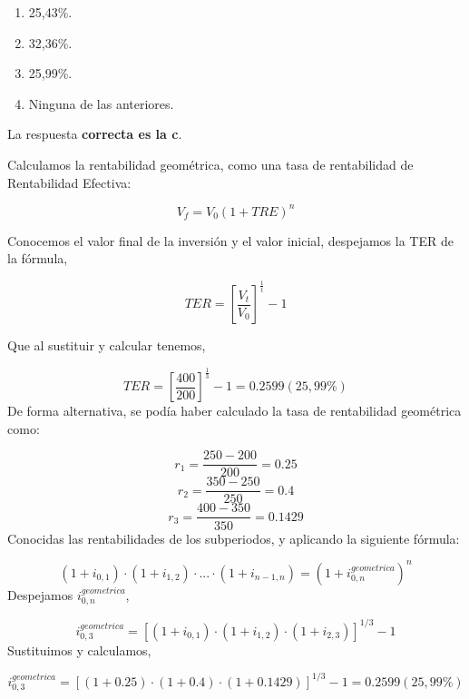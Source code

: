 \documentclass[
  letterpaper,
  DIV=11,
  numbers=noendperiod]{scrreprt}
\begin{document}
\begin{enumerate}
\def\labelenumi{\alph{enumi})}
\item
  25,43\%.
\item
  32,36\%.
\item
  25,99\%.
\item
  Ninguna de las anteriores.
\end{enumerate}

\begin{tcolorbox}[enhanced jigsaw, left=2mm, opacityback=0, colback=white, breakable, arc=.35mm, bottomrule=.15mm, rightrule=.15mm, toprule=.15mm, leftrule=.75mm, colframe=quarto-callout-tip-color-frame]
\begin{minipage}[t]{5.5mm}
\textcolor{quarto-callout-tip-color}{\faLightbulb}
\end{minipage}%
\begin{minipage}[t]{\textwidth - 5.5mm}

La respuesta \textbf{correcta es la c}.

Calculamos la rentabilidad geométrica, como una tasa de rentabilidad de
Rentabilidad Efectiva:

\[V_f=V_0\left(1+TRE\right)^n\]

Conocemos el valor final de la inversión y el valor inicial, despejamos
la TER de la fórmula,

\[TER=\left[\frac{V_t }{V_0 }\right] ^{\frac{1}{t}}-1\]

Que al sustituir y calcular tenemos,

\[TER=\left[\frac{400 }{200}\right] ^{\frac{1}{3}}-1=0.2599(25,99\%)\]
De forma alternativa, se podía haber calculado la tasa de rentabilidad
geométrica como:

\[r_1=\frac{250-200}{200}=0.25\] \[r_2=\frac{350-250}{250}=0.4\]
\[r_3=\frac{400-350}{350}=0.1429\] Conocidas las rentabilidades de los
subperiodos, y aplicando la siguiente fórmula:

\[\left(1+i_{0,1}\right)\cdot\left(1+i_{1,2}\right)\cdot...\cdot\left(1+i_{n-1,n}\right)=\left(1+i_{0,n}^{geometrica}\right)^n\]
Despejamos \(i_{0,n}^{geometrica}\),

\[i_{0,3}^{geometrica}=\left[\left(1+i_{0,1}\right)\cdot\left(1+i_{1,2}\right)\cdot\left(1+i_{2,3}\right)\right]^{1/3}-1\]
Sustituimos y calculamos,

\[i_{0,3}^{geometrica}=\left[\left(1+0.25\right)\cdot\left(1+0.4\right)\cdot\left(1+0.1429\right)\right]^{1/3}-1=0.2599(25,99\%)\]

\end{minipage}%
\end{tcolorbox}
\end{document}
